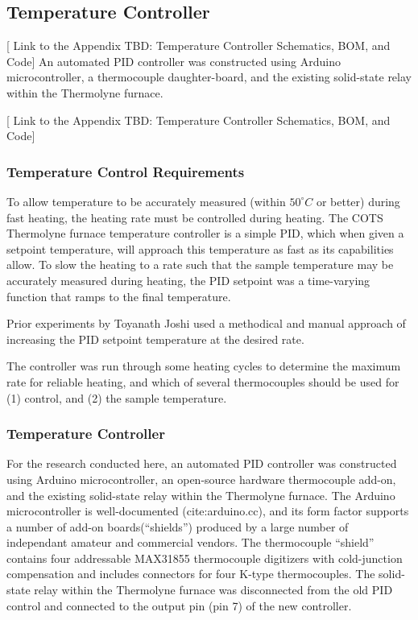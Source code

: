 \documentclass[12pt,oneside,english]{article}
\begin{document}
    \subsection{Temperature Controller}
    [ Link to the Appendix TBD: Temperature Controller Schematics, BOM, and Code]
    An automated PID controller was constructed using Arduino microcontroller, a thermocouple daughter-board, and the existing solid-state relay within the Thermolyne furnace.  

    [ Link to the Appendix TBD: Temperature Controller Schematics, BOM, and Code]
    
    \subsubsection*{Temperature Control Requirements}    
    To allow temperature to be accurately measured (within $50^{\circ}C$ or better) during fast heating, the heating rate must be controlled during heating.
    The COTS Thermolyne furnace temperature controller is a simple PID, which when given a setpoint temperature, will approach this temperature as fast as its capabilities allow.
    To slow the heating to a rate such that the sample temperature may be accurately measured during heating, the PID setpoint was a time-varying function that ramps to the final temperature.

    Prior experiments by Toyanath Joshi used a methodical and manual approach of increasing the PID setpoint temperature at the desired rate.  

    The controller was run through some heating cycles to determine the maximum rate for reliable heating, and which of several thermocouples should be used for (1) control, and (2) the sample temperature.
    
    \subsubsection*{Temperature Controller}

    For the research conducted here, an automated PID controller was constructed using Arduino microcontroller, an open-source hardware thermocouple add-on, and the existing solid-state relay within the Thermolyne furnace.  
    The Arduino microcontroller is well-documented (cite:arduino.cc), and its form factor supports a number of add-on boards(``shields'') produced by a large number of independant amateur and commercial vendors.
    The thermocouple ``shield'' contains four addressable MAX31855 thermocouple digitizers with cold-junction compensation and includes connectors for four K-type thermocouples.
    The solid-state relay within the Thermolyne furnace was disconnected from the old PID control and connected to the output pin (pin 7) of the new controller.
\end{document}

